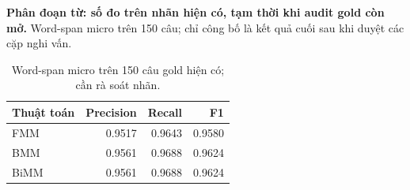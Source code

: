 
\textbf{Phân đoạn từ: số đo trên nhãn hiện có, tạm thời khi audit gold còn mở.} Word-span micro trên 150 câu; chỉ công bố là kết quả cuối sau khi duyệt các cặp nghi vấn.

\begin{table}[htbp]
\centering
\begin{tabular}{|l|r|r|r|}
\hline
Thuật toán & Precision & Recall & F1 \\
\hline
FMM & 0.9517 & 0.9643 & 0.9580 \\
BMM & 0.9561 & 0.9688 & 0.9624 \\
BiMM & 0.9561 & 0.9688 & 0.9624 \\
\hline
\end{tabular}
\caption{Word-span micro trên 150 câu gold hiện có; cần rà soát nhãn.}
\end{table}
